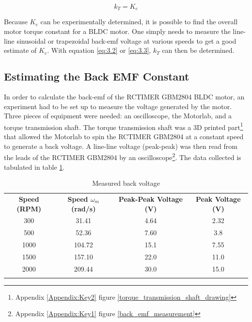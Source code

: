 \begin{equation} \label{eq:3.3}
k_T = K_{e}
\end{equation}

Because \(K_{e}\) can be experimentally determined, it is possible to find the overall motor torque constant for a BLDC motor. One simply needs to measure the line-line sinusoidal or trapezoidal back-emf voltage at various speeds to get a good estimate of \(K_{e}\). With equation \ref{eq:3.2} or \ref{eq:3.3}, \(k_T\) can then be determined.

\subsection{Estimating the Back EMF Constant}
In order to calculate the back-emf of the RCTIMER GBM2804 BLDC motor, an experiment had to be set up to measure the voltage generated by the motor. Three pieces of equipment were needed: an oscilloscope, the Motorlab, and a torque transmission shaft. The torque transmission shaft was a 3D printed part\footnote{Appendix \ref{Appendix:Key2} figure \ref{torque_transmission_shaft_drawing}} that allowed the Motorlab to spin the RCTIMER GBM2804 at a constant speed to generate a back voltage. A line-line voltage (peak-peak) was then read from the leads of the RCTIMER GBM2804 by an oscilloscope\footnote{Appendix \ref{Appendix:Key1} figure \ref{back_emf_measurement}}. The data collected is tabulated in table \ref{table3}.

\begin{table}[H] %
\begin{center}
\caption{Measured back voltage }
\begin{tabular}[c]{ c c c c }

\textbf{Speed (RPM)} & \textbf{Speed \(\omega_m\) (rad/s)} & \textbf{Peak-Peak Voltage (V)} & \textbf{Peak Voltage (V)}\\

\Xhline{2\arrayrulewidth}

\rowcolor{gray!20}
300  & 31.41  & 4.64 & 2.32\\


500 & 52.36 & 7.60 & 3.8\\

\rowcolor{gray!20}
1000 & 104.72 & 15.1 & 7.55\\


1500 & 157.10 & 22.0 & 11.0\\

\rowcolor{gray!20}
2000 & 209.44 & 30.0 & 15.0\\

\Xhline{2\arrayrulewidth}
\end{tabular}

\label{table3}
\end{center}
\end{table}


